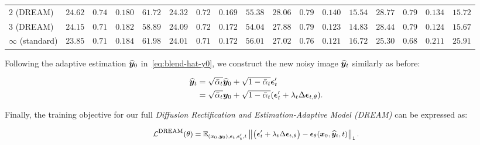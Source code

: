\begin{table*}[t]
\begin{tabular}{ccccccccc|cccccccc}
\multicolumn{1}{l}{$2$ (DREAM)} & $24.62$ & \cellcolor{orange!20}$0.74$ & \cellcolor{orange!20}$0.180$ & \multicolumn{1}{c|}{$61.72$} & $24.32$ & $0.72$ & \cellcolor{orange!20}$0.169$ & $55.38$ & $28.06$ & \cellcolor{orange!20}$0.79$ & $0.140$ & \multicolumn{1}{c|}{$15.54$} & $28.77$ & $0.79$ & \cellcolor{orange!20}$0.134$ & \cellcolor{orange!20}$15.72$ \\
\multicolumn{1}{l}{$3$ (DREAM)} & $24.15$ & $0.71$ & $0.182$ & \multicolumn{1}{c|}{ \cellcolor{orange!20}$58.89$} & $24.09$ & $0.72$ & $0.172$ & \cellcolor{orange!20}$54.04$ & $27.88$ & \cellcolor{orange!20}$0.79$ & \cellcolor{orange!20}$0.123$ & \multicolumn{1}{c|}{\cellcolor{orange!20}$14.83$} & $28.44$ & $0.79$ & \cellcolor{red!20}$0.124$ & \cellcolor{red!20}$15.67$ \\\midrule
\multicolumn{1}{l}{$\infty$ (standard)} & $23.85$ & $0.71$ & $0.184$ & \multicolumn{1}{c|}{$61.98$} & $24.01$ & $0.71$ & $0.172$ & $56.01$ & $27.02$ & $0.76$ & \cellcolor{red!20}$0.121$ & \multicolumn{1}{c|}{$16.72$} & $25.30$ & $0.68$ & $0.211$ & $25.91$ \\ \bottomrule
\end{tabular}
\vspace{-.1in}
\end{table*}


Following the adaptive estimation $\widehat{{\bm{y}}}_0$ in~\cref{eq:blend-hat-y0}, we construct the new noisy image $\widehat{{\bm{y}}}_t$ similarly as before:

\vspace{-.2in}
\begin{align}\label{eq:hat-yt}
\begin{split}
\small
    \widehat{{\bm{y}}}_t & = \sqrt{\bar{\alpha}_t}\widehat{{\bm{y}}}_0+\sqrt{1-\bar{\alpha}_t}\bm \epsilon'_t \\
    &= \sqrt{\bar{\alpha}_t}{\bm{y}}_0+ \sqrt{1-\bar{\alpha}_t}(\bm\epsilon'_t+\lambda_t\Delta\bm{{\mathbf{\epsilon}}}_{t,\theta}).
\end{split}
\end{align}
\vspace{-.1in}

\noindent
Finally, the training objective for our full \emph{Diffusion Rectification and Estimation-Adaptive Model (DREAM)} can be expressed as:

\vspace{-.2in}
\begin{align}\label{eq:dream-objective}
\small
    {\mathcal{L}}^{\text{DREAM}}({\mathbf{\theta}}) = \mathbb{E}_{({\bm{x}}_0,{\bm{y}}_0), \bm{{\mathbf{\epsilon}}}_t,\bm{{\mathbf{\epsilon}}}'_t, t} \left\|\big(\bm{{\mathbf{\epsilon}}}'_t +\lambda_t\Delta\bm{{\mathbf{\epsilon}}}_{t,\theta}\big) -\bm{{\mathbf{\epsilon}}}_{\mathbf{\theta}}({\bm{x}}_0,\widehat{{\bm{y}}}_t, t) \right\|_1.
\end{align}
\vspace{-.2in}

